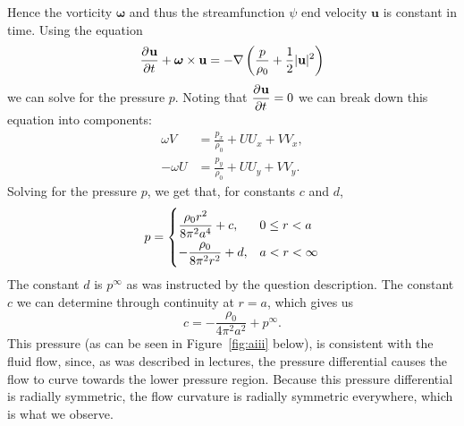 \documentclass{article}
\def\*#1{\mathbf{#1}}
\newcommand{\omegavec}{\boldsymbol{\omega}}
\begin{document}
Hence the vorticity $\omegavec$ and thus the streamfunction $\psi$ end
velocity $\*u$ is constant in time. Using the equation
%
\begin{equation*}
    \dpd{\*u}{t} + \omegavec \times \*u = - \nabla \del{\frac{p}{\rho_0} + \frac{1}{2} |\*u|^2}
\end{equation*}
%
we can solve for the pressure $p$. Noting that $\dpd{\*u}{t} = 0$ we can
break down this equation into components:
%
\begin{align*}
    \omega V &= \frac{p_x}{\rho_0} + U U_x + V V_x, \\
    - \omega U &= \frac{p_y}{\rho_0} + U U_y + V V_y
    .
\end{align*}
%
Solving for the pressure $p$, we get that, for constants $c$ and $d$,
%
\begin{equation*}
    p =
    \begin{dcases}
        \frac{\rho_0 r^2}{8 \pi^2 a^4} + c, &0 \leq r < a \\
        - \frac{\rho_0}{8 \pi^2 r^2} + d, &a < r < \infty
    \end{dcases}
\end{equation*}
%
The constant $d$ is $p^\infty$ as was instructed by the question description. The
constant $c$ we can determine through continuity at $r = a$, which gives us
%
\begin{equation*}
    c = - \frac{\rho_0}{4 \pi^2 a^2} + p^\infty
    .
\end{equation*}
%
This pressure (as can be seen in Figure~\ref{fig:aiii} below), is
consistent with the fluid flow, since, as was described in lectures, the
pressure differential causes the flow to curve towards the lower
pressure region. Because this pressure differential is radially
symmetric, the flow curvature is radially symmetric everywhere, which is
what we observe.
\end{document}
